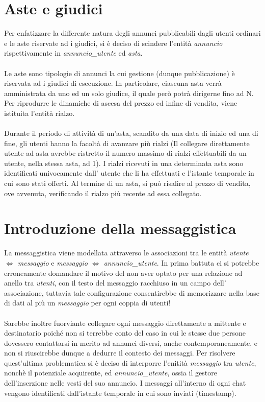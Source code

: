 \documentclass[a4paper,12pt]{report}
\begin{document}
        \newpage
        \section{Aste e giudici}
        Per enfatizzare la differente natura degli annunci pubblicabili dagli utenti ordinari e le aste riservate ad i giudici,
        si è deciso di scindere l'entità \textit{annuncio} rispettivamente in \textit{annuncio\_utente} ed \textit{asta}. \\
        \\
        Le aste sono tipologie di annunci la cui gestione (dunque pubblicazione) è riservata ad i giudici di esecuzione.
        In particolare, ciascuna asta verrà amministrata da uno ed un solo giudice, il quale però potrà dirigerne fino ad N.
        Per riprodurre le dinamiche di ascesa del prezzo ed infine di vendita, viene istituita l’entità rialzo. \\
        \\
        Durante il periodo di attività di un’asta, scandito da una data di inizio ed una di fine, gli utenti hanno la facoltà di avanzare più rialzi 
        (Il collegare direttamente utente ad asta avrebbe ristretto il numero massimo di rialzi effettuabili da un utente, nella stessa asta, ad 1).
        I rialzi ricevuti in una determinata asta sono identificati univocamente dall’ utente che li ha effettuati e l’istante temporale in cui sono 
        stati offerti. Al termine di un asta, si può risalire al prezzo di vendita, ove avvenuta, verificando il rialzo più recente ad essa collegato.
        	
    	\section{Introduzione della messaggistica}
        La messaggistica viene modellata attraverso le associazioni tra le entità \textit{utente $\Leftrightarrow$ messaggio} e 
        \textit{messaggio $\Leftrightarrow$ annuncio\_utente}. In prima battuta ci si potrebbe erroneamente domandare il motivo 
        del non aver optato per una relazione ad anello tra \textit{utenti}, con il testo del messaggio racchiuso in un campo 
        dell’ associazione, tuttavia tale configurazione consentirebbe di memorizzare nella base di dati al più un 
        \textit{messaggio} per ogni coppia di utenti! \\
        \\
        Sarebbe inoltre fuorviante collegare ogni messaggio direttamente 
        a mittente e destinatario poiché non si terrebbe conto del caso in cui le stesse due persone dovessero contattarsi in merito ad annunci 
        diversi, anche contemporaneamente, e non si riuscirebbe dunque a dedurre il contesto dei messaggi. Per risolvere quest’ultima problematica 
        si è deciso di interporre l'enitità \textit{messaggio} tra \textit{utente}, nonchè il potenziale acquirente, ed \textit{annuncio\_utente}, 
        ossia il gestore dell’inserzione nelle vesti del suo annuncio. I messaggi all’interno di ogni chat vengono identificati dall’istante 
        temporale in cui sono inviati (timestamp). \\
        
\end{document}
